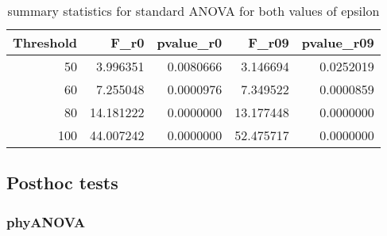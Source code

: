 \documentclass[]{article}
\begin{document}
\begin{table}[H]

\caption{\label{tab:unnamed-chunk-8}summary statistics for standard ANOVA for both values of epsilon}
\centering
\begin{tabular}{r|r|r|r|r}
\hline
Threshold & F\_r0 & pvalue\_r0 & F\_r09 & pvalue\_r09\\
\hline
50 & 3.996351 & 0.0080666 & 3.146694 & 0.0252019\\
\hline
60 & 7.255048 & 0.0000976 & 7.349522 & 0.0000859\\
\hline
80 & 14.181222 & 0.0000000 & 13.177448 & 0.0000000\\
\hline
100 & 44.007242 & 0.0000000 & 52.475717 & 0.0000000\\
\hline
\end{tabular}
\end{table}

\hypertarget{posthoc-tests}{%
\subsection{Posthoc tests}\label{posthoc-tests}}

\hypertarget{phyanova-1}{%
\subsubsection{phyANOVA}\label{phyanova-1}}
\end{document}
